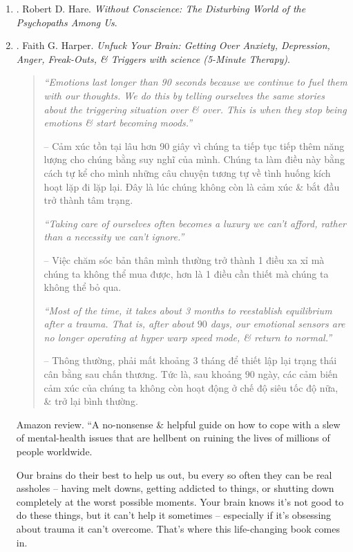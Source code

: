 \documentclass{article}
\begin{document}
\begin{enumerate}
	\item \cite{Hare1999}. {\sc Robert D. Hare}. {\it Without Conscience: The Disturbing World of the Psychopaths Among Us}.\hfill{\sf[reading]}

	\item \cite{Harper_unfuck_brain}. {\sc Faith G. Harper}. {\it Unfuck Your Brain: Getting Over Anxiety, Depression, Anger, Freak-Outs, \& Triggers with science (5-Minute Therapy)}.
	\begin{quotation}
		{\it``Emotions last longer than 90 seconds because we continue to fuel them with our thoughts. We do this by telling ourselves the same stories about the triggering situation over \& over. This is when they stop being emotions \& start becoming moods.''}

		-- Cảm xúc tồn tại lâu hơn 90 giây vì chúng ta tiếp tục tiếp thêm năng lượng cho chúng bằng suy nghĩ của mình. Chúng ta làm điều này bằng cách tự kể cho mình những câu chuyện tương tự về tình huống kích hoạt lặp đi lặp lại. Đây là lúc chúng không còn là cảm xúc \& bắt đầu trở thành tâm trạng.

		{\it``Taking care of {\sc ourselves} often becomes a luxury we can't afford, rather than a necessity we can't ignore.''}

		-- Việc chăm sóc {\sc bản thân mình} thường trở thành 1 điều xa xỉ mà chúng ta không thể mua được, hơn là 1 điều cần thiết mà chúng ta không thể bỏ qua.

		{\it``Most of the time, it takes about 3 months to reestablish equilibrium after a trauma. That is, after about $90$ days, our emotional sensors are no longer operating at hyper warp speed mode, \& return to normal.''}

		-- Thông thường, phải mất khoảng 3 tháng để thiết lập lại trạng thái cân bằng sau chấn thương. Tức là, sau khoảng $90$ ngày, các cảm biến cảm xúc của chúng ta không còn hoạt động ở chế độ siêu tốc độ nữa, \& trở lại bình thường.
	\end{quotation}
	{\sf Amazon review.} ``A no-nonsense \& helpful guide on how to cope with a slew of mental-health issues that are hellbent on ruining the lives of millions of people worldwide.

	Our brains do their best to help us out, bu every so often they can be real assholes -- having melt downs, getting addicted to things, or shutting down completely at the worst possible moments. Your brain knows it's not good to do these things, but it can't help it sometimes -- especially if it's obsessing about trauma it can't overcome. That's where this life-changing book comes in.


\end{enumerate}
\end{document}
